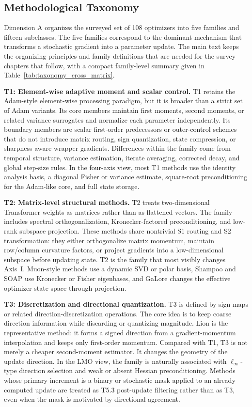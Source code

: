 \subsection{Methodological Taxonomy}
\label{sec:taxonomy-method}

Dimension A organizes the surveyed set of 108 optimizers into five families
and fifteen subclasses.  The five
families correspond to the dominant mechanism that transforms a stochastic
gradient into a parameter update.  The main text keeps the organizing
principles and family definitions that are needed for the survey chapters that
follow, with a compact family-level summary given in
Table~\ref{tab:taxonomy_cross_matrix}.

\textbf{T1: Element-wise adaptive moment and scalar control.}
T1 retains the Adam-style element-wise processing paradigm, but it is broader
than a strict set of Adam variants.  Its core members maintain first moments,
second moments, or related variance surrogates and normalize each parameter
independently.  Its boundary members are scalar first-order predecessors or
outer-control schemes that do not introduce matrix routing, sign
quantization, state compression, or sharpness-aware wrapper gradients.
Differences within the family come from temporal structure, variance
estimation, iterate averaging, corrected decay, and global step-size rules.
In the four-axis view, most T1 methods use the identity analysis basis, a
diagonal Fisher or variance estimate, square-root preconditioning for the
Adam-like core, and full state storage.

\textbf{T2: Matrix-level structural methods.}
T2 treats two-dimensional Transformer weights as matrices rather than as
flattened vectors.  The family includes spectral orthogonalization,
Kronecker-factored preconditioning, and low-rank subspace projection.  These
methods share nontrivial S1 routing and S2 transformation: they either
orthogonalize matrix momentum, maintain row/column curvature factors, or
project gradients into a low-dimensional subspace before updating state.  T2
is the family that most visibly changes Axis~I.  Muon-style methods use a
dynamic SVD or polar basis, Shampoo and SOAP use Kronecker or Fisher eigenbases,
and GaLore changes the effective optimizer-state space through projection.

\textbf{T3: Discretization and directional quantization.}
T3 is defined by sign maps or related direction-discretization operations.
The core idea is to keep coarse direction information while discarding or
quantizing magnitude.  Lion is the representative method: it forms a signed
direction from a gradient-momentum interpolation and keeps only first-order
momentum.  Compared with T1, T3 is not merely a cheaper second-moment
estimator.  It changes the geometry of the update direction.  In the LMO view,
the family is naturally associated with $\ell_\infty$-type direction
selection and weak or absent Hessian preconditioning.  Methods whose primary
increment is a binary or stochastic mask applied to an already computed
update are treated as T5.3 post-update filtering rather than as T3, even when
the mask is motivated by directional agreement.

